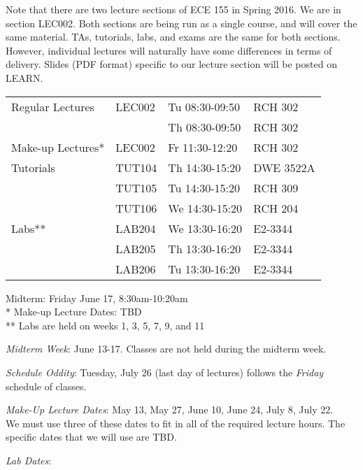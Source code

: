 \documentclass[letterpaper,10pt]{article}
\begin{document}
Note that there are two lecture sections of ECE 155 in Spring 2016. We are in section LEC002. Both sections are being run as a single course, and will cover the same material. TAs, tutorials, labs, and exams are the same for both sections. However, individual lectures will naturally have some differences in terms of delivery. Slides (PDF format) specific to our lecture section will be posted on LEARN.

\begin{table}[h]
        \begin{center}
        \begin{tabular}{l l l l}
				Regular Lectures & LEC002 & Tu 08:30-09:50 & RCH 302 	\\
								 & 		  & Th 08:30-09:50 & RCH 302 	\\
				\hline
				Make-up Lectures*& LEC002 & Fr 11:30-12:20 & RCH 302 	\\
				\hline			
				Tutorials 		 & TUT104 & Th 14:30-15:20 & DWE 3522A 	\\
						  		 & TUT105 & Tu 14:30-15:20 & RCH 309   	\\
						  		 & TUT106 & We 14:30-15:20 & RCH 204   	\\
				\hline			
				Labs** 	  		 & LAB204 & We 13:30-16:20 & E2-3344	\\
								 & LAB205 & Th 13:30-16:20 & E2-3344	\\
								 & LAB206 & Tu 13:30-16:20 & E2-3344	\\
				\hline
			\end{tabular}
        \end{center}
        Midterm: Friday June 17, 8:30am-10:20am				\\
		*    Make-up Lecture Dates: TBD						\\
		**   Labs are held on weeks 1, 3, 5, 7, 9, and 11
\end{table}

\textit{Midterm Week}: June 13-17. Classes are not held during the midterm week.

\textit{Schedule Oddity}: Tuesday, July 26 (last day of lectures) follows the \textit{Friday} schedule of classes.

\textit{Make-Up Lecture Dates}: May 13, May 27, June 10, June 24, July 8, July 22. \\
We must use three of these dates to fit in all of the required lecture hours. The specific dates that we will use are TBD.

\textit{Lab Dates}:
\end{document}
